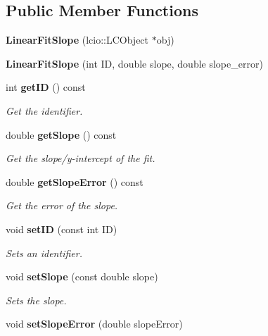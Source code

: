 \subsection*{Public Member Functions}
\begin{DoxyCompactItemize}
\item 
{\bfseries Linear\-Fit\-Slope} (lcio\-::\-L\-C\-Object $\ast$obj)\label{classCALICE_1_1LinearFitSlope_a56c966d126341015453783e858b5afda}

\item 
{\bfseries Linear\-Fit\-Slope} (int I\-D, double slope, double slope\-\_\-error)\label{classCALICE_1_1LinearFitSlope_a4d769bd2d4bc5bd2d7cc7136f04092da}

\item 
int {\bf get\-I\-D} () const \label{classCALICE_1_1LinearFitSlope_af64381cf56c2cae77c77d4a476638197}

\begin{DoxyCompactList}\small\item\em Get the identifier. \end{DoxyCompactList}\item 
double {\bf get\-Slope} () const 
\begin{DoxyCompactList}\small\item\em Get the slope/y-\/intercept of the fit. \end{DoxyCompactList}\item 
double {\bf get\-Slope\-Error} () const \label{classCALICE_1_1LinearFitSlope_aab0ecd9b3ecff1110159c335e4efd3c2}

\begin{DoxyCompactList}\small\item\em Get the error of the slope. \end{DoxyCompactList}\item 
void {\bf set\-I\-D} (const int I\-D)\label{classCALICE_1_1LinearFitSlope_ad6db15cec37ac81794b4ac73c8c4894d}

\begin{DoxyCompactList}\small\item\em Sets an identifier. \end{DoxyCompactList}\item 
void {\bf set\-Slope} (const double slope)\label{classCALICE_1_1LinearFitSlope_a0d35587b2fb909e93cc04391b6167e37}

\begin{DoxyCompactList}\small\item\em Sets the slope. \end{DoxyCompactList}\item 
void {\bf set\-Slope\-Error} (double slope\-Error)\label{classCALICE_1_1LinearFitSlope_a7ded89ec05a1418e1ee13a83b87d8b47}


\end{DoxyCompactItemize}
